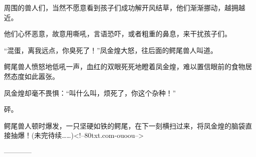 \begin{this_body}
周围的兽人们，当然不愿意看到孩子们成功解开风结草，他们渐渐挪动，越拥越近。

他们心怀恶意，故意用嘶吼，言语恐吓，或者粗重的鼻息，来干扰孩子们。

“混蛋，离我远点，你臭死了！”凤金煌大怒，往后面的鳄尾兽人叫道。

鳄尾兽人愤怒地低吼一声，血红的双眼死死地瞪着凤金煌，难以置信眼前的食物居然态度如此嚣张。

凤金煌却毫不畏惧：“叫什么叫，烦死了，你这个杂种！”

砰。

鳄尾兽人顿时爆发，一只坚硬如铁的鳄尾，在下一刻横扫过来，将凤金煌的脑袋直接抽爆！(未完待续……)<!--80txt.com-ouoou-->

------------

\end{this_body}

